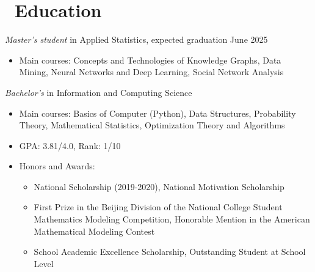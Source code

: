 \documentclass{resume}
\begin{document}



\section{\faGraduationCap\ Education}
\textit{Master's student} in Applied Statistics, expected graduation June 2025
\begin{itemize}
  \item Main courses: Concepts and Technologies of Knowledge Graphs, Data Mining, Neural Networks and Deep Learning, Social Network Analysis
\end{itemize}

\textit{Bachelor's} in Information and Computing Science
\begin{itemize}
  \item Main courses: Basics of Computer (Python), Data Structures, Probability Theory, Mathematical Statistics, Optimization Theory and Algorithms
  \item GPA: 3.81/4.0, Rank: 1/10
  \item Honors and Awards:
        \begin{itemize}
          \item National Scholarship (2019-2020), National Motivation Scholarship
          \item First Prize in the Beijing Division of the National College Student Mathematics Modeling Competition, Honorable Mention in the American Mathematical Modeling Contest
          \item School Academic Excellence Scholarship, Outstanding Student at School Level
        \end{itemize}
\end{itemize}
\end{document}
